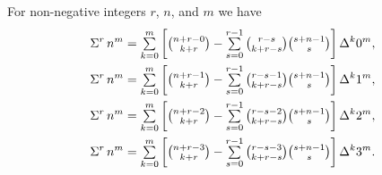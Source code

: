 \begin{example}
  For non-negative integers $r$, $n$, and $m$ we have
  \begin{align*}
    \Sigma^{r}\,{n}^{m}
    &=
    \mathop{\textstyle\sum}_{k=0}^{m}
    \left[
      \tbinom{n+r-0}{k+r}
      -
      \mathop{\textstyle\sum}_{s=0}^{r-1}
      \tbinom{r-s}{k+r-s}
      \tbinom{s+n-1}{s}
    \right]
    \Delta^k 0^m,
    \\
    \Sigma^{r}\,{n}^{m}
    &=
    \mathop{\textstyle\sum}_{k=0}^{m}
    \left[
      \tbinom{n+r-1}{k+r}
      -
      \mathop{\textstyle\sum}_{s=0}^{r-1}
      \tbinom{r-s-1}{k+r-s}
      \tbinom{s+n-1}{s}
    \right]
    \Delta^k 1^m,
    \\
    \Sigma^{r}\,{n}^{m}
    &=
    \mathop{\textstyle\sum}_{k=0}^{m}
    \left[
      \tbinom{n+r-2}{k+r}
      -
      \mathop{\textstyle\sum}_{s=0}^{r-1}
      \tbinom{r-s-2}{k+r-s}
      \tbinom{s+n-1}{s}
    \right]
    \Delta^k 2^m,
    \\
    \Sigma^{r}\,{n}^{m}
    &=
    \mathop{\textstyle\sum}_{k=0}^{m}
    \left[
      \tbinom{n+r-3}{k+r}
      -
      \mathop{\textstyle\sum}_{s=0}^{r-1}
      \tbinom{r-s-3}{k+r-s}
      \tbinom{s+n-1}{s}
    \right]
    \Delta^k 3^m.
  \end{align*}
\end{example}
